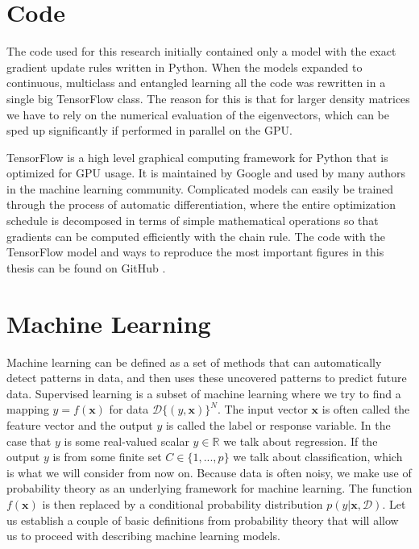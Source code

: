 \section{Code}

The code used for this research initially contained only a model with the exact gradient update rules written in Python. When the models expanded to continuous, multiclass and entangled learning all the code was rewritten in a single big TensorFlow class. The reason for this is that for larger density matrices we have to rely on the numerical evaluation of the eigenvectors, which can be sped up significantly if performed in parallel on the GPU.\newline

TensorFlow is a high level graphical computing framework for Python that is optimized for GPU usage. It is maintained by Google and used by many authors in the machine learning community. Complicated models can easily be trained through the process of automatic differentiation, where the entire optimization schedule is decomposed in terms of simple mathematical operations so that gradients can be computed efficiently with the chain rule. The code with the TensorFlow model and ways to reproduce the most important figures in this thesis can be found on GitHub \cite{WiersemaGit2019a}. 

\section{Machine Learning}

Machine learning can be defined as a set of methods that can automatically detect patterns in data, and then uses these uncovered patterns to predict future data. Supervised learning is a subset of machine learning where we try to find a mapping $y = f(\mathbf{x})$ for data $\mathcal{D}\{(y, \mathbf{x})\}^N$. The input vector $\mathbf{x}$ is often called the feature vector and the output $y$ is called the label or response variable. In the case that $y$ is some real-valued scalar $y\in \mathbb{R}$ we talk about regression. If the output $y$ is from some finite set $C\in \{1,...,p\}$ we talk about classification, which is what we will consider from now on. Because data is often noisy, we make use of probability theory as an underlying framework for machine learning. The function $f(\mathbf{x})$ is then replaced by a conditional probability distribution $p(y | \mathbf{x}, \mathcal{D})$. Let us establish a couple of basic definitions from probability theory that will allow us to proceed with describing machine learning models.\newline

